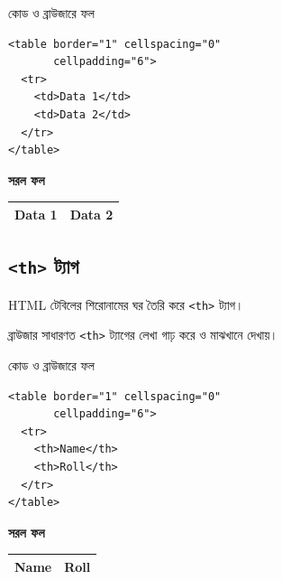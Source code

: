 \begin{chFourWholeExample}{কোড ও ব্রাউজারে ফল}
\noindent
\begin{minipage}[t]{.50\linewidth}\vspace{0pt}
\begin{verbatim}
<table border="1" cellspacing="0"
       cellpadding="6">
  <tr>
    <td>Data 1</td>
    <td>Data 2</td>
  </tr>
</table>
\end{verbatim}
\end{minipage}\hfill
\begin{minipage}[t]{.46\linewidth}\vspace{0pt}
\textbf{সরল ফল}\par
\begin{tabular}{|l|l|}\hline
Data 1 & Data 2 \\\hline
\end{tabular}
\end{minipage}
\end{chFourWholeExample}

\subsection{\texttt{<th>} ট্যাগ}

\begin{definitionbox}{}
HTML টেবিলের শিরোনামের ঘর তৈরি করে \texttt{<th>} ট্যাগ।
\end{definitionbox}

ব্রাউজার সাধারণত \texttt{<th>} ট্যাগের লেখা গাঢ় করে ও মাঝখানে দেখায়।

\begin{chFourWholeExample}{কোড ও ব্রাউজারে ফল}
\noindent
\begin{minipage}[t]{.50\linewidth}\vspace{0pt}
\begin{verbatim}
<table border="1" cellspacing="0"
       cellpadding="6">
  <tr>
    <th>Name</th>
    <th>Roll</th>
  </tr>
</table>
\end{verbatim}
\end{minipage}\hfill
\begin{minipage}[t]{.46\linewidth}\vspace{0pt}
\textbf{সরল ফল}\par
\begin{tabular}{|l|l|}\hline
\textbf{Name} & \textbf{Roll} \\\hline
\end{tabular}
\end{minipage}
\end{chFourWholeExample}

